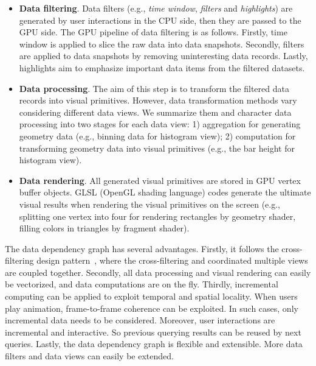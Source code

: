 \begin{itemize}
	\item \textbf{Data filtering}. Data filters (e.g., \textsl{time window}, \textsl{filters} and \textsl{highlights}) are generated by user interactions in the CPU side, then they are passed to the GPU side.  The GPU pipeline of data filtering is as follows. Firstly,  time window is applied to slice the raw data into data snapshots. Secondly,  filters are applied to data snapshots by removing uninteresting data records. Lastly, highlights  aim to emphasize important data items from the filtered datasets.  
	\item \textbf{Data processing}. The aim of this step is to transform the filtered data records into visual primitives. However, data transformation methods vary considering different data views. We summarize them and character data processing into two stages for each data view: 1) aggregation for generating geometry data (e.g., binning data for histogram view); 2) computation for transforming geometry data into visual primitives  (e.g., the bar height for histogram view).
	\item \textbf{Data rendering}. All generated visual primitives are stored in GPU vertex buffer objects. GLSL (OpenGL shading language) codes generate the ultimate visual results when rendering the visual primitives on the screen (e.g.,  splitting one vertex into four for rendering rectangles by geometry shader,  filling colors in triangles by fragment shader). 
\end{itemize}	
 

 


The data dependency graph has several advantages. Firstly, it follows the cross-filtering design pattern~\cite{weaver2010cross}, where the cross-filtering and coordinated multiple views are coupled together.
Secondly, all data processing and visual rendering can easily be vectorized, and data computations are on the fly. Thirdly,  incremental computing can be applied to exploit temporal and spatial locality. When users play animation, frame-to-frame coherence can be exploited. In such cases, only incremental data needs to be considered. Moreover, user interactions are  incremental and interactive. So previous querying results can be reused by next queries. Lastly, the data dependency graph is flexible and extensible. More data filters and data views can easily be extended.


~~~~~~~~~~~~~~~~  


